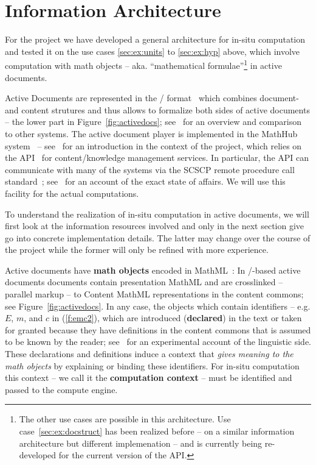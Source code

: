 \section{Information Architecture}\label{sec:infarch}

For the \pn project we have developed a general architecture for in-situ computation and
tested it on the use cases \ref{sec:ex:units} to \ref{sec:ex:hyp} above, which involve
computation with math objects -- aka. ``mathematical formulae''\footnote{The other use
  cases are possible in this architecture. Use case~\ref{sec:ex:docstruct} has been
  realized before -- on a similar information architecture but different implemenation --
  and is currently being re-developed for the current version of the \mmt API.} in active
documents.

Active Documents are represented in the \omdoc/\mmt
format~\cite{Kohlhase:OMDoc1.2,uniformal:on,Iancu:phd} which combines document- and
content strutures and thus allows to formalize both sides of active documents -- the lower
part in Figure~\ref{fig:activedocs}; see~ for an overview and comparison to
other \pn systems. The active document player is implemented in the MathHub
system~\cite{MathHub:on} -- see~\cite{ODK-D4.3} for an introduction in the context of the
\pn project, which relies on the \mmt API~\cite{Rabe:MAGMS13,uniformal:on} for
content/knowledge management services. In particular, the \mmt API can communicate with
many of the \pn systems via the SCSCP remote procedure call
standard~\cite{HHKLRAT:SCSCP10}; see~\cite{ODK-D3.3} for an account of the exact state of
affairs. We will use this facility for the actual computations.

To understand the realization of in-situ computation in active documents, we will first
look at the information resources involved and only in the next section give go into
concrete implementation details. The latter may change over the course of the \pn project
while the former will only be refined with more experience.

Active documents have \textbf{math objects} encoded in
MathML~\cite{CarlisleEd:MathML3:base}: In \omdoc/\mmt-based active documents documents
contain presentation MathML and are crosslinked -- parallel markup -- to Content MathML
representations in the content commons; see Figure~\ref{fig:activedocs}. In any case, the
objects which contain identifiers -- e.g. $E$, $m$, and $c$ in (\ref{f:emc2}), which are
introduced (\textbf{declared}) in the text or taken for granted because they have
definitions in the content commons that is assumed to be known by the reader;
see~\cite{WolGriKoh:udc11} for an experimental account of the linguistic side. These
declarations and definitions induce a context that \emph{gives meaning to the math
  objects} by explaining or binding these identifiers. For in-situ computation this
context -- we call it the \textbf{computation context} -- must be identified and passed to
the compute engine.

